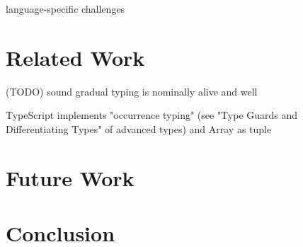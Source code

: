 language-specific challenges



\renewcommand{\thechapter}{4}
\chapter{Related Work}

(TODO) sound gradual typing is nominally alive and well


TypeScript implements "occurrence typing" (see "Type Guards and Differentiating Types" of advanced types) and Array as tuple 
\renewcommand{\thechapter}{5}

\chapter{Future Work}

\renewcommand{\thechapter}{6}
\chapter{Conclusion}